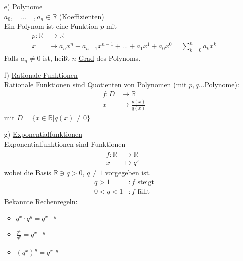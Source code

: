 \documentclass[12pt, titlepage]{article}
\newcommand{\R}{\mathds{R}}
\renewcommand{\*}{\cdot}
\begin{document}
\begin{itemize}
\begin{itemize}
\begin{itemize}
\begin{minipage}[c]{0.5\textwidth}
				\end{minipage}
			\end{itemize}
		\end{itemize}
		\item[e)] \underline{Polynome}\\
		$a_0,\quad...\quad,a_n\in\R$ (Koeffizienten)\\
		Ein Polynom ist eine Funktion $p$ mit 
		\begin{align*}
			p\colon \R&\rightarrow\R\\
			x&\mapsto a_nx^n+a_{n-1}x^{n-1}+...+a_1x^1+a_0x^0=\sum_{k=0}^{n}{a_kx^k}
		\end{align*}
		Falls $a_n\neq 0$ ist, heißt $n$ \underline{Grad} des Polynoms.
		\item[f)] \underline{Rationale Funktionen}\\
		Rationale Funktionen sind Quotienten von Polynomen (mit $p,q$...Polynome):
		\begin{align*}
			f\colon D&\rightarrow\R\\
			x&\mapsto\frac{p(x)}{q(x)}
		\end{align*}
		mit $D=\{x\in\R|q(x)\neq 0\}$
		\item[g)] \underline{Exponentialfunktionen}\\
		Exponentialfunktionen sind Funktionen
		\begin{align*}
			f\colon\R&\rightarrow\R^+\\
			x&\mapsto q^x
		\end{align*} wobei die Basis $\R\ni q>0$, $q\neq 1$ vorgegeben ist.
		\begin{align*}
			q>1&\colon\textrm{$f$ steigt}\\
			0<q<1&\colon\textrm{$f$ fällt}
		\end{align*}
		Bekannte Rechenregeln:
		\begin{itemize}
			\item $q^x\* q^y=q^{x+y}$
			\item $\frac{q^x}{q^y}=q^{x-y}$
			\item $(q^x)^y=q^{x\* y}$

\end{itemize}
\end{itemize}
\end{document}
